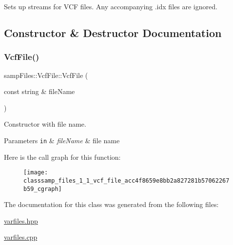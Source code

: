 Sets up streams for V\+CF files. Any accompanying .idx files are ignored. 

\subsection{Constructor \& Destructor Documentation}
\mbox{\label{classsamp_files_1_1_vcf_file_acc4f8659e8bb2a827281b57062267b59}} 
\subsubsection{\texorpdfstring{Vcf\+File()}{VcfFile()}}
{\footnotesize\ttfamily samp\+Files\+::\+Vcf\+File\+::\+Vcf\+File (\begin{DoxyParamCaption}\item[{const string \&}]{file\+Name }\end{DoxyParamCaption})\hspace{0.3cm}{\ttfamily [inline]}}



Constructor with file name. 


\begin{DoxyParams}[1]{Parameters}
\mbox{\tt in}  & {\em file\+Name} & file name \\
\hline
\end{DoxyParams}
Here is the call graph for this function\+:\nopagebreak
\begin{figure}[H]
\begin{center}
\leavevmode
\texttt{[image: classsamp\_files\_1\_1\_vcf\_file\_acc4f8659e8bb2a827281b57062267b59\_cgraph]}
\end{center}
\end{figure}


The documentation for this class was generated from the following files\+:\begin{DoxyCompactItemize}
\item 
\hyperlink{varfiles_8hpp}{varfiles.\+hpp}\item 
\hyperlink{varfiles_8cpp}{varfiles.\+cpp}\end{DoxyCompactItemize}

